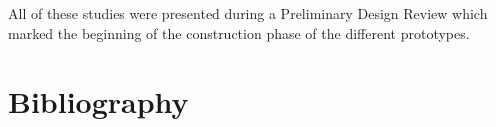\begin{refsection}
  All of these studies were presented during a Preliminary Design Review which marked the beginning of the construction phase of the different prototypes.
  

  \cleardoublepage
  \section*{Bibliography}
  \label{ch3:bib}
  \printbibliography[heading=subbibliography]

\end{refsection}